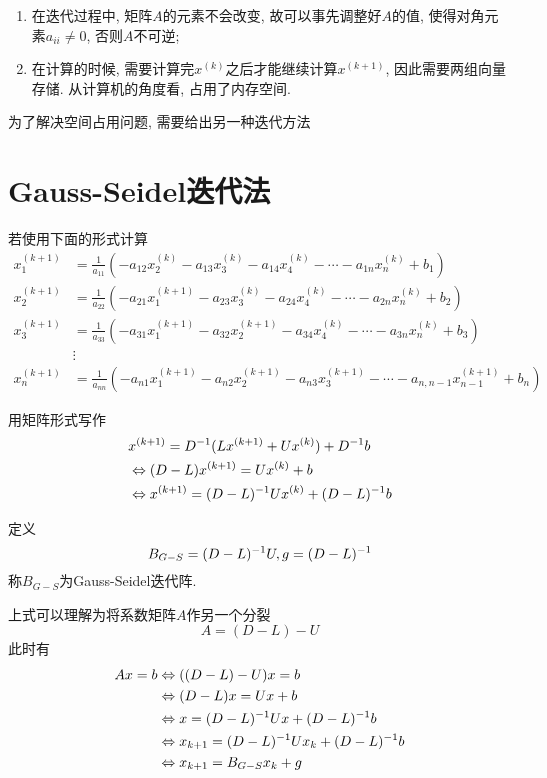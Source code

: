 \begin{enumerate}
    \item 在迭代过程中, 矩阵$A$的元素不会改变, 故可以事先调整好$A$的值, 使得对角元素$a_{ii}\ne0$, 否则$A$不可逆;
    \item 在计算的时候, 需要计算完$x^{(k)}$之后才能继续计算$x^{(k+1)}$, 因此需要两组向量存储. 从计算机的角度看, 占用了内存空间.
\end{enumerate}

为了解决空间占用问题, 需要给出另一种迭代方法

\section{Gauss-Seidel迭代法}

若使用下面的形式计算
\begin{align*}
    x_1^{(k+1)}&=\frac{1}{a_{11}}(-a_{12}x_2^{(k)}-a_{13}x_3^{(k)}-a_{14}x_4^{(k)}-\cdots-a_{1n}x_n^{(k)}+b_1)\\
    x_2^{(k+1)}&=\frac{1}{a_{22}}(-a_{21}x_1^{(k+1)}-a_{23}x_3^{(k)}-a_{24}x_4^{(k)}-\cdots-a_{2n}x_n^{(k)}+b_2)\\
    x_3^{(k+1)}&=\frac{1}{a_{33}}(-a_{31}x_1^{(k+1)}-a_{32}x_2^{(k+1)}-a_{34}x_4^{(k)}-\cdots-a_{3n}x_n^{(k)}+b_3)\\
    &\vdots\\
    x_n^{(k+1)}&=\frac{1}{a_{nn}}(-a_{n1}x_1^{(k+1)}-a_{n2}x_2^{(k+1)}-a_{n3}x_3^{(k+1)}-\cdots-a_{n,n-1}x_{n-1}^{(k+1)}+b_n)
\end{align*}

用矩阵形式写作
\begin{align*}
    &x^{(k+1)}=D^{-1}(Lx^{(k+1)}+Ux^{(k)})+D^{-1}b\\
    &\Leftrightarrow (D-L)x^{(k+1)}=Ux^{(k)}+b\\
    &\Leftrightarrow x^{(k+1)}=(D-L)^{-1}Ux^{(k)}+(D-L)^{-1}b
\end{align*}

定义
\begin{equation*}
    B_{G-S}=(D-L)^{-1}U, g=(D-L)^{-1}
\end{equation*}
称$B_{G-S}$为Gauss-Seidel迭代阵.

上式可以理解为将系数矩阵$A$作另一个分裂
\begin{equation*}
    A=(D-L)-U
\end{equation*}
此时有
\begin{align*}
    Ax=b&\Leftrightarrow ((D-L)-U)x=b\\
    &\Leftrightarrow (D-L)x=Ux+b\\
    &\Leftrightarrow x=(D-L)^{-1}Ux+(D-L)^{-1}b\\
    &\Leftrightarrow x_{k+1}=(D-L)^{-1}Ux_k+(D-L)^{-1}b\\
    &\Leftrightarrow x_{k+1}=B_{G-S}x_k+g
\end{align*}

